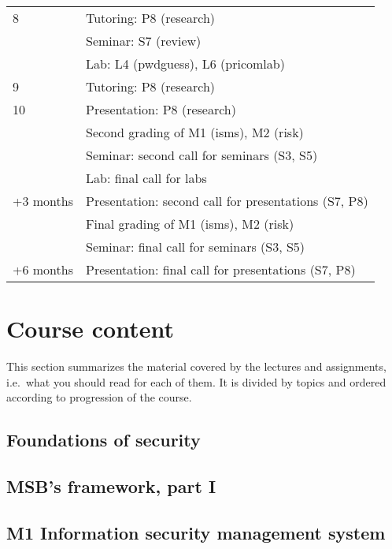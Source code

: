 \begin{table}
\begin{tabular}{lp{9cm}}
    \midrule
    8
    & Tutoring: P8 (research)\\
    & Seminar: S7 (review)\\
    & Lab: L4 (pwdguess), L6 (pricomlab)\\
    \midrule
    9
    & Tutoring: P8 (research)\\
    \midrule
    10
    & Presentation: P8 (research)\\
    & Second grading of M1 (isms), M2 (risk)\\
    & Seminar: second call for seminars (S3, S5)\\
    & Lab: final call for labs\\
    \midrule
    +3 months
    & Presentation: second call for presentations (S7, P8)\\
    & Final grading of M1 (isms), M2 (risk)\\
    & Seminar: final call for seminars (S3, S5)\\
    \midrule
    +6 months
    & Presentation: final call for presentations (S7, P8)\\
    \bottomrule
  \end{tabular}
\end{table}


\section{Course content}

This section summarizes the material covered by the lectures and assignments, 
i.e.\ what you should read for each of them.
It is divided by topics and ordered according to progression of the course.

\subsection{Foundations of security}


%
%
\subsection{MSB's framework, part I}


\subsection{M1 Information security management system}


